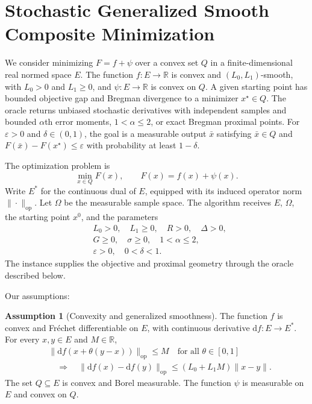 \documentclass[10pt]{article}
\theoremstyle{definition}
\newtheorem{assumption}{Assumption}
\begin{document}
\section*{Stochastic Generalized Smooth Composite Minimization}
We consider minimizing $F=f+\psi$ over a convex set $Q$ in a finite-dimensional real normed space $E$. The function $f:E\to\mathbb{R}$ is convex and $(L_0,L_1)$-smooth, with $L_0>0$ and $L_1\geq0$, and $\psi:E\to\mathbb{R}$ is convex on $Q$. A given starting point has bounded objective gap and Bregman divergence to a minimizer $x^\star\in Q$. The oracle returns unbiased stochastic derivatives with independent samples and bounded $\alpha$th error moments, $1<\alpha\leq2$, or exact Bregman proximal points. For $\varepsilon>0$ and $\delta\in(0,1)$, the goal is a measurable output $\bar{x}$ satisfying $\bar{x}\in Q$ and $F(\bar{x})-F(x^\star)\leq\varepsilon$ with probability at least $1-\delta$.

The optimization problem is
\[
\min_{x\in Q} F(x),
\qquad F(x)=f(x)+\psi(x).
\]
Write $E^*$ for the continuous dual of $E$, equipped with its induced operator norm $\|\cdot\|_{\mathrm{op}}$. Let $\Omega$ be the measurable sample space. The algorithm receives $E$, $\Omega$, the starting point $x^0$, and the parameters
\[
\begin{aligned}
&L_0>0,\quad L_1\geq0,\quad R>0,\quad \Delta>0,\\
&G\geq0,\quad \sigma\geq0,\quad 1<\alpha\leq2,\\
&\varepsilon>0,\quad 0<\delta<1.
\end{aligned}
\]
The instance supplies the objective and proximal geometry through the oracle described below.

Our assumptions:
\begin{assumption}[Convexity and generalized smoothness]
The function $f$ is convex and Fr\'echet differentiable on $E$, with continuous derivative $\mathrm{d}f:E\to E^*$. For every $x,y\in E$ and $M\in\mathbb{R}$,
\[
\begin{aligned}
&\|\mathrm{d}f(x+\theta(y-x))\|_{\mathrm{op}}\leq M
\quad\text{for all }\theta\in[0,1]\\
&\hspace{1em}\Longrightarrow\quad
\|\mathrm{d}f(x)-\mathrm{d}f(y)\|_{\mathrm{op}}
\leq (L_0+L_1M)\|x-y\|.
\end{aligned}
\]
The set $Q\subseteq E$ is convex and Borel measurable. The function $\psi$ is measurable on $E$ and convex on $Q$.
\end{assumption}
\end{document}
